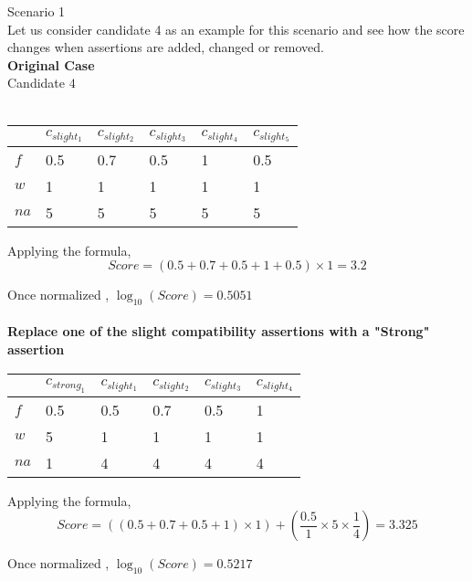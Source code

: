 \documentclass[11pt]{article}
\begin{document}
\begin{large}
Scenario 1 \\

Let us consider candidate 4 as an example for this scenario and see how the score changes when assertions are added, changed or removed.\\

\textbf{Original Case} \\
Candidate $4$ \\ \\
\begin{tabular}{|l|l|l|l|l|l|}
\hline
  & $c_{slight_{1}}$  & $c_{slight_{2}}$  & $c_{slight_{3}}$  & $c_{slight_{4}}$ & $c_{slight_{5}}$  \\ \hline
$f$ & 0.5 & 0.7 & 0.5 & 1  & 0.5 \\ \hline
$w$ & 1   & 1   & 1   & 1  & 1  \\ \hline
$na$ & 5  & 5  & 5  & 5 & 5  \\ \hline
\end{tabular}

Applying the formula, \\
$$Score = (0.5 + 0.7 +0.5 +1 + 0.5) \times 1 = 3.2 $$

Once normalized , $\log_{10}(Score) =  0.5051$ \\ \\



\textbf{Replace one of the slight compatibility assertions with a "Strong" assertion} \\
\begin{tabular}{|l|l|l|l|l|l|}
\hline
     & $c_{strong_{1}}$ & $c_{slight_{1}}$ & $c_{slight_{2}}$ & $c_{slight_{3}}$ & $c_{slight_{4}}$ \\ \hline
$f$  & 0.5              & 0.5              & 0.7              & 0.5              & 1                \\ \hline
$w$  & 5                & 1                & 1                & 1                & 1                \\ \hline
$na$ & 1                & 4                & 4                & 4                & 4                \\ \hline
\end{tabular}

Applying the formula, \\
$$Score = ((0.5 + 0.7 +0.5 +1) \times 1) + (\frac{0.5}{1} \times 5 \times \frac{1}{4}) = 3.325 $$

Once normalized , $\log_{10}(Score) =  0.5217$ \\ \\


\end{large}
\end{document}
